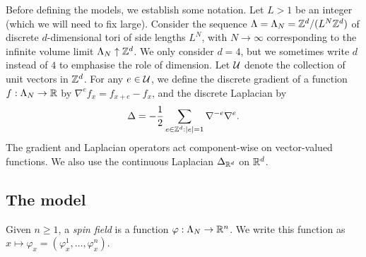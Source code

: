 Before defining the models, we establish some notation.
Let $L > 1$ be an integer (which we will need to fix large).
Consider the sequence $\Lambda=\Lambda_N = {\mathbb Z}^d/(L^N{\mathbb Z}^d)$ of
discrete $d$-dimensional tori of side lengths $L^N$,
with $N \to \infty$ corresponding to the infinite volume limit $\Lambda_N \uparrow {\mathbb Z}^d$.
We only consider $d=4$, but we sometimes write $d$ instead of $4$
to emphasise the role of dimension.
Let $\mathcal{U}$ denote the collection of unit vectors in ${ {{\mathbb Z}}^d }$. %
For any $e \in \mathcal{U}$, %
we define the discrete gradient of a function $f:\Lambda_N \rightarrow {\mathbb R}$
by $\nabla^e f_x = f_{x + e} - f_x$, and
the discrete Laplacian by
\begin{equation}
\label{e:DeltaLambda}
\Delta = -\frac{1}{2}\sum_{e\in{\mathbb Z}^d:|e| = 1}\nabla^{-e} \nabla^{e}.
\end{equation}
The gradient and Laplacian operators act component-wise on vector-valued functions.
We also use the
continuous Laplacian $\Delta_{{ {{\mathbb R}}^d}}$ on ${ {{\mathbb R}}^d}$.

\subsection{The \texorpdfstring{\phifour}{phi4} model}


Given $n \ge 1$,
a \emph{spin field} is a function $\varphi : \Lambda_N \rightarrow {\mathbb R}^n$.
We write this function as $x \mapsto \varphi_x =(\varphi_x^1,\ldots,\varphi_x^n)$.

